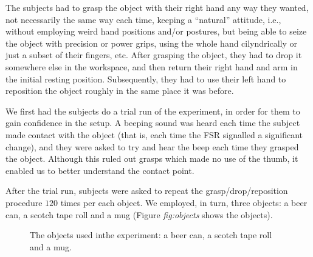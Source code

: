 The subjects had to grasp the object with their right hand any way
they wanted, not necessarily the same way each time, keeping a
``natural'' attitude, i.e., without employing weird hand positions
and/or postures, but being able to seize the object with precision or
power grips, using the whole hand cilyndrically or just a subset of
their fingers, etc. After grasping the object, they had to drop it
somewhere else in the workspace, and then return their right hand and
arm in the initial resting position. Subsequently, they had to use
their left hand to reposition the object roughly in the same place it
was before.

We first had the subjects do a trial run of the experiment, in order
for them to gain confidence in the setup. A beeping sound was heard
each time the subject made contact with the object (that is, each time
the FSR signalled a significant change), and they were asked to try
and hear the beep each time they grasped the object. Although this
ruled out grasps which made no use of the thumb, it enabled us to
better understand the contact point.

After the trial run, subjects were asked to repeat the
grasp/drop/reposition procedure $120$ times per each object. We
employed, in turn, three objects: a beer can, a scotch tape roll and a
mug (Figure \emph{fig:objects} shows the objects).

\begin{figure}[htbp]
  \begin{center}
    \caption{The objects used inthe experiment: a beer can, a scotch
    tape roll and a mug.}
    \label{fig:objects}
  \end{center}
\end{figure}


